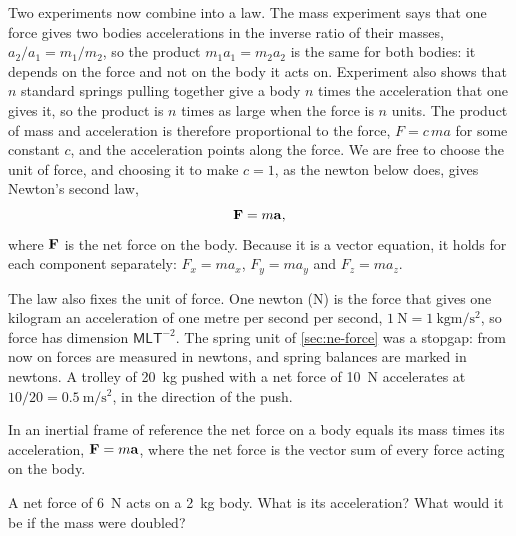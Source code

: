 Two experiments now combine into a law. The mass
experiment says that one force gives two bodies accelerations in the
inverse ratio of their masses, $a_2/a_1 = m_1/m_2$, so the product $m_1
a_1 = m_2 a_2$ is the same for both bodies: it depends on the force and
not on the body it acts on. Experiment also shows that $n$ standard
springs pulling together give a body $n$ times the acceleration that one
gives it, so the product is $n$ times as large when the force is $n$
units. The product of mass and acceleration is therefore proportional to
the force, $F = c\,ma$
for some constant $c$, and the acceleration points along the force. We
are free to choose the unit of force, and choosing it to make $c = 1$, as
the newton below does, gives Newton's second law,
\begin{equation}
   \bm{\mathrm{F}} = m\bm{\mathrm{a}} ,
   \label{eq:ne-second-law}
\end{equation}
where $\bm{\mathrm{F}}$ is the net force on the body. Because it is a vector
equation, it holds for each component separately: $F_x = m a_x$, $F_y =
m a_y$ and $F_z = m a_z$.

The law also fixes the unit of force. One newton (\si{\newton}) is the
force that gives one kilogram an acceleration of one metre per second per
second, $\SI{1}{\newton} = \SI{1}{\kilogram\metre\per\second\squared}$,
so force has dimension $\mathsf{M}\mathsf{L}\mathsf{T}^{-2}$. The spring
unit of \cref{sec:ne-force} was a stopgap: from now on forces are measured
in newtons, and spring balances are marked in newtons. A trolley of
\SI{20}{\kilogram} pushed with a net force of \SI{10}{\newton}
accelerates at $10/20 = \SI{0.5}{\metre\per\second\squared}$, in the
direction of the push.

\begin{keyidea}
In an inertial frame of reference the net force on a body equals its mass
times its acceleration, $\bm{\mathrm{F}} = m\bm{\mathrm{a}}$, where the net force is the
vector sum of every force acting on the body.
\end{keyidea}

\begin{selfcheck}
A net force of \SI{6}{\newton} acts on a \SI{2}{\kilogram} body. What is
its acceleration? What would it be if the mass were doubled?
\end{selfcheck}

